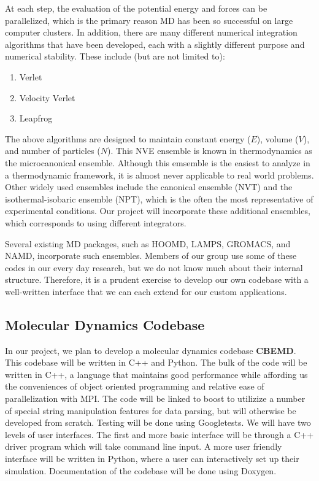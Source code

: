\documentclass[10pt]{article}
\begin{document}
At each step, the evaluation of the potential energy and forces can be parallelized, which is the primary reason MD has been so successful on large computer clusters.  In addition, there are many different numerical integration algorithms that have been developed, each with a slightly different purpose and numerical stability.  These include (but are not limited to):

\begin{enumerate}
    \item Verlet
    \item Velocity Verlet
    \item Leapfrog
\end{enumerate}

The above algorithms are designed to maintain constant energy ($E$), volume ($V$), and number of particles ($N$).  This NVE ensemble is known in thermodynamics as the microcanonical ensemble.
Although this emsemble is the easiest to analyze in a thermodynamic framework, it is almost never applicable to real world problems.
Other widely used ensembles include the canonical ensemble (NVT) and the isothermal-isobaric ensemble (NPT), which is the often the most representative of experimental conditions.
Our project will incorporate these additional ensembles, which corresponds to using different integrators.

Several existing MD packages, such as HOOMD, LAMPS, GROMACS, and NAMD, incorporate such ensembles. Members of our group use some of these codes in our every day research, but we do not know much about their internal structure. Therefore, it is a prudent exercise to develop our own codebase with a well-written interface that we can each extend for our custom applications.

\subsection{Molecular Dynamics Codebase}
In our project, we plan to develop a molecular dynamics codebase \textbf{CBEMD}. This codebase will be written in C++ and Python. The bulk of the code will be written in C++, a language that maintains good performance while affording us the conveniences of object oriented programming and relative ease of parallelization with MPI.  The code will be linked to boost to utilizize a number of special string manipulation features for data parsing, but will otherwise be developed from scratch. Testing will be done using Googletests. We will have two levels of user interfaces.  The first and more basic interface will be through a C++ driver program which will take command line input.  A more user friendly interface will be written in Python, where a user can interactively set up their simulation. Documentation of the codebase will be done using Doxygen.
\end{document}
